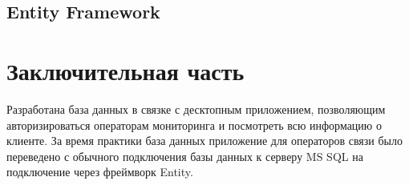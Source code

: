 \subsection{Entity Framework}


\newpage
\section{Заключительная часть}

\vspace{0.5cm}
\hspace{0.6cm}
Разработана база данных в связке с десктопным приложением, позволяющим авторизироваться операторам мониторинга и посмотреть всю информацию о клиенте. За время практики база данных приложение для операторов связи было переведено с обычного подключения базы данных к серверу MS SQL на подключение через фреймворк Entity.
